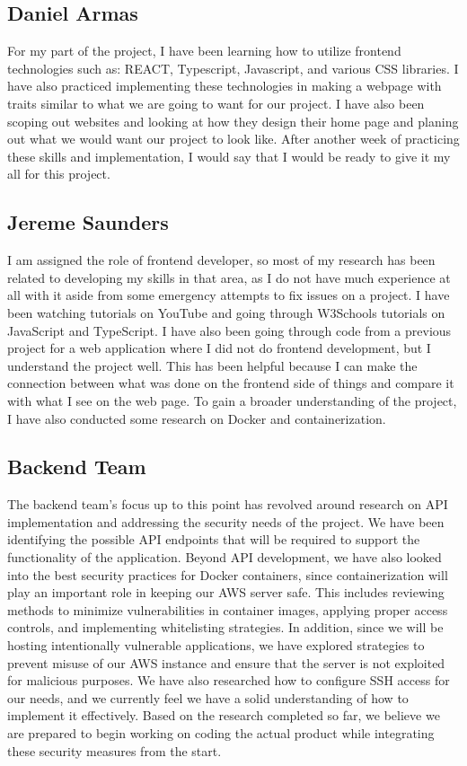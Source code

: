 \documentclass[12pt]{article}
\begin{document}
\subsection{Daniel Armas}
For my part of the project, I have been learning how to utilize frontend technologies such as: REACT, Typescript, Javascript, and various CSS libraries. I have also practiced implementing these technologies in making a webpage with traits similar to what we are going to want for our project. I have also been scoping out websites and looking at how they design their home page and planing out what we would want our project to look like. After another week of practicing these skills and implementation, I would say that I would be ready to give it my all for this project. 

\subsection{Jereme Saunders}
I am assigned the role of frontend developer, so most of my research has been related to developing my skills in that area, as I do not have much experience at all with it aside from some emergency attempts to fix issues on a project. I have been watching tutorials on YouTube and going through W3Schools tutorials on JavaScript and TypeScript.  I have also been going through code from a previous project for a web application where I did not do frontend development, but I understand the project well. This has been helpful because I can make the connection between what was done on the frontend side of things and compare it with what I see on the web page. To gain a broader understanding of the project, I have also conducted some research on Docker and containerization.

\subsection{Backend Team}
The backend team’s focus up to this point has revolved around research on API implementation and addressing the security needs of the project. We have been identifying the possible API endpoints that will be required to support the functionality of the application. Beyond API development, we have also looked into the best security practices for Docker containers, since containerization will play an important role in keeping our AWS server safe. This includes reviewing methods to minimize vulnerabilities in container images, applying proper access controls, and implementing whitelisting strategies. In addition, since we will be hosting intentionally vulnerable applications, we have explored strategies to prevent misuse of our AWS instance and ensure that the server is not exploited for malicious purposes. We have also researched how to configure SSH access for our needs, and we currently feel we have a solid understanding of how to implement it effectively. Based on the research completed so far, we believe we are prepared to begin working on coding the actual product while integrating these security measures from the start.
\end{document}
